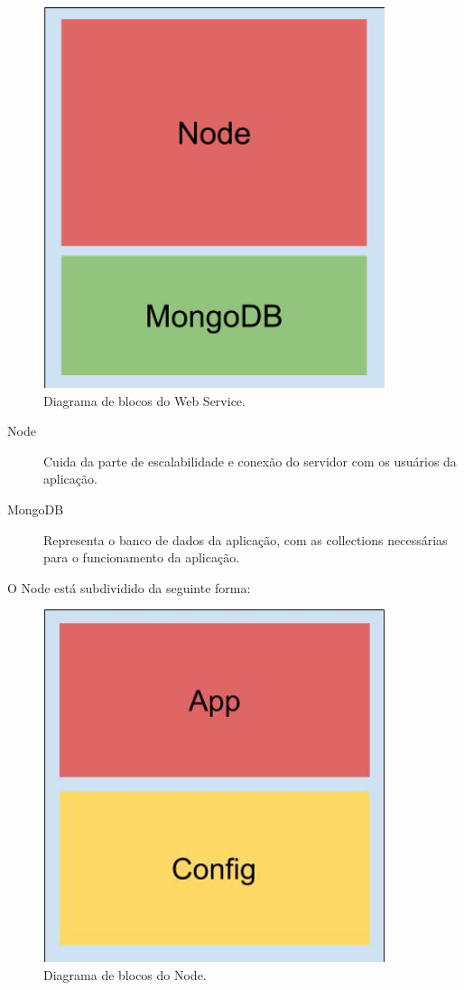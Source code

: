\documentclass[
	12pt,				%
	oneside,			%
	a4paper,			%
	brazil				%
]{abntex2}
\begin{document}
{\begin{figure}[h]
\centering
\includegraphics[width=10cm, center]{images/brick_diagram_framework_webservice}
\caption{Diagrama de blocos do Web Service.}
\label{Rotulo}
\end{figure}

\begin{description}
\item[Node] Cuida da parte de escalabilidade e conexão do servidor com os usuários da aplicação.
\item[MongoDB] Representa o banco de dados da aplicação, com as collections necessárias para o funcionamento da aplicação.
\end{description}

O Node está subdividido da seguinte forma:

\begin{figure}[h]
\centering
\includegraphics[width=10cm, center]{images/brick_diagram_node}
\caption{Diagrama de blocos do Node.}
\label{Rotulo}
\end{figure}

}
\end{document}
